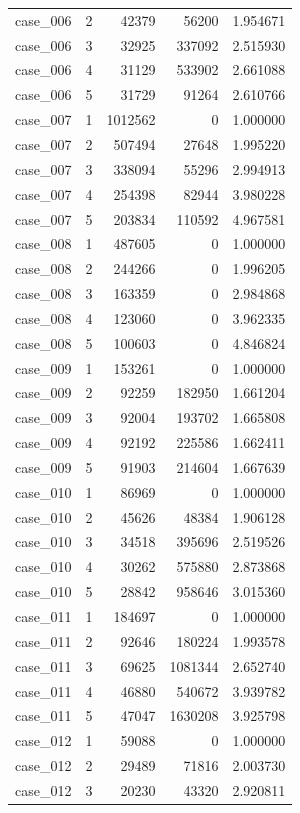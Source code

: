 \begin{longtable}{lrrrr}
case\_006 & 2 & 42379 & 56200 & 1.954671 \\
case\_006 & 3 & 32925 & 337092 & 2.515930 \\
case\_006 & 4 & 31129 & 533902 & 2.661088 \\
case\_006 & 5 & 31729 & 91264 & 2.610766 \\
case\_007 & 1 & 1012562 & 0 & 1.000000 \\
case\_007 & 2 & 507494 & 27648 & 1.995220 \\
case\_007 & 3 & 338094 & 55296 & 2.994913 \\
case\_007 & 4 & 254398 & 82944 & 3.980228 \\
case\_007 & 5 & 203834 & 110592 & 4.967581 \\
case\_008 & 1 & 487605 & 0 & 1.000000 \\
case\_008 & 2 & 244266 & 0 & 1.996205 \\
case\_008 & 3 & 163359 & 0 & 2.984868 \\
case\_008 & 4 & 123060 & 0 & 3.962335 \\
case\_008 & 5 & 100603 & 0 & 4.846824 \\
case\_009 & 1 & 153261 & 0 & 1.000000 \\
case\_009 & 2 & 92259 & 182950 & 1.661204 \\
case\_009 & 3 & 92004 & 193702 & 1.665808 \\
case\_009 & 4 & 92192 & 225586 & 1.662411 \\
case\_009 & 5 & 91903 & 214604 & 1.667639 \\
case\_010 & 1 & 86969 & 0 & 1.000000 \\
case\_010 & 2 & 45626 & 48384 & 1.906128 \\
case\_010 & 3 & 34518 & 395696 & 2.519526 \\
case\_010 & 4 & 30262 & 575880 & 2.873868 \\
case\_010 & 5 & 28842 & 958646 & 3.015360 \\
case\_011 & 1 & 184697 & 0 & 1.000000 \\
case\_011 & 2 & 92646 & 180224 & 1.993578 \\
case\_011 & 3 & 69625 & 1081344 & 2.652740 \\
case\_011 & 4 & 46880 & 540672 & 3.939782 \\
case\_011 & 5 & 47047 & 1630208 & 3.925798 \\
case\_012 & 1 & 59088 & 0 & 1.000000 \\
case\_012 & 2 & 29489 & 71816 & 2.003730 \\
case\_012 & 3 & 20230 & 43320 & 2.920811 \\

\end{longtable}
